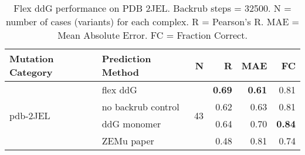 \begin{table}
  \begin{tabular}{llrrrr}
\toprule
Mutation Category &   Prediction Method &   N &    R &  MAE &   FC \\
\midrule
 \multirow{ 4}{*}{pdb-2JEL} & flex ddG & \multirow{ 4}{*}{43} & \textbf{0.69} & \textbf{0.61} & 0.81  \\
 & no backrub control & & 0.62 & 0.63 & 0.81  \\
 & ddG monomer & & 0.64 & 0.70 & \textbf{0.84}  \\
 & ZEMu paper & & 0.48 & 0.81 & 0.74  \\
\bottomrule
\end{tabular}
  \caption[Flex ddG performance on PDB 2JEL]{
    Flex ddG performance on PDB 2JEL. Backrub steps = 32500. N = number of cases (variants) for each complex. R = Pearson's R. MAE = Mean Absolute Error. FC = Fraction Correct.
  } \label{tab:table-pdb-2JEL}
\end{table}

